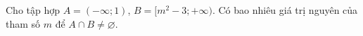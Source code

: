 \begin{ex}
Cho tập hợp $A=(-\infty;1)$, $B=[m^2-3;+\infty)$. Có bao nhiêu giá trị nguyên của tham số $m$ để $A\cap B\ne\varnothing$.
\end{ex}

